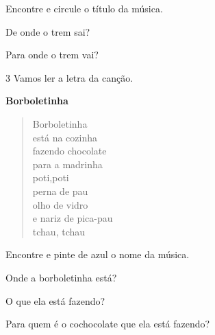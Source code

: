 \begin{escolha}
\item  Encontre e circule o título da música.

\item De onde o trem sai?


\item Para onde o trem vai?

\end{escolha}

\num{3} Vamos ler a letra da canção.


\textbf{Borboletinha}

\begin{verse}
Borboletinha\\
está na cozinha\\
fazendo chocolate\\
para a madrinha\\
poti,poti\\
perna de pau\\
olho de vidro\\
e nariz de pica-pau\\
tchau, tchau
\end{verse}


\begin{escolha}
\item Encontre e pinte de azul o nome da música.

\item Onde a borboletinha está?


\item O que ela está fazendo?


\item Para quem é o cochocolate que ela está fazendo?

\end{escolha}

